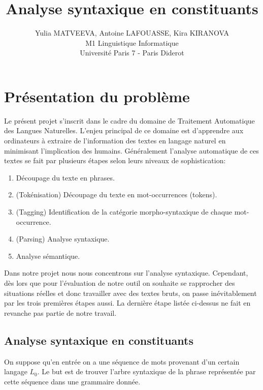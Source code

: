 \documentclass[12pt]{article}
\begin{document}
\title{Analyse syntaxique en constituants}
\author{Yulia MATVEEVA, Antoine LAFOUASSE, Kira KIRANOVA\\
M1 Linguistique Informatique\\
Universit\'e Paris 7 - Paris Diderot}
\date{}
\maketitle

\section{Pr\'esentation du probl\`eme}

Le pr\'esent projet s'inscrit dans le cadre du domaine de Traitement Automatique
des Langues Naturelles. L'enjeu principal de ce domaine est d'apprendre aux ordinateurs  \`a extraire de l'information des textes en langage naturel en minimisant l'implication des humains. G\'en\'eralement l'analyse automatique de ces textes se fait par plusieurs \'etapes selon leurs niveaux de sophistication:

\begin{enumerate}
\item D\'ecoupage du texte en phrases.
\item (Tok\'enisation) D\'ecoupage du texte en mot-occurrences (tokens).
\item (Tagging) Identification de la cat\'egorie morpho-syntaxique de chaque
mot-occurrence.
\item (Parsing) Analyse syntaxique.
\item Analyse s\'emantique.
\end{enumerate}

Dans notre projet nous nous concentrons sur l'analyse syntaxique. Cependant, d\`es lors que pour l'\'evaluation de notre outil on souhaite se rapprocher des situations r\'eelles et donc travailler avec des textes bruts, on passe in\'evitablement par les trois premi\`eres \'etapes aussi. La derni\`ere \'etape list\'ee ci-dessus ne fait en revanche pas partie de notre travail.

\subsection{Analyse syntaxique en constituants}
 On suppose qu'en entr\'ee on a une s\'equence de mots provenant d'un certain
 langage $L_0$. Le but est de trouver l'arbre syntaxique de la phrase
 repr\'esent\'ee par cette s\'equence dans une grammaire donn\'ee.
\end{document}
